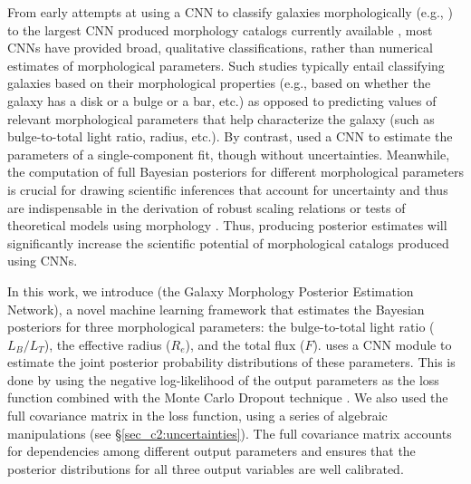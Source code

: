 From early attempts at using a CNN to classify galaxies morphologically (e.g.,  \citealp{Dieleman2015Rotation-invariantPrediction}) to the largest CNN produced morphology catalogs currently available \citep{Cheng2021GalaxyNetworks, Vega-Ferrero2021PushingSurvey}, most
CNNs have provided broad, qualitative classifications, rather than 
numerical estimates of morphological parameters. Such studies typically entail classifying galaxies based on their morphological properties (e.g., based on whether the galaxy has a disk or a bulge or a bar, etc.) as opposed to predicting values of relevant morphological parameters that help characterize the galaxy (such as bulge-to-total light ratio, radius, etc.).
By contrast, \citet{Tuccillo2018DeepFitting} used a CNN to estimate the parameters of a single-component \sersic{} fit, though  without uncertainties. 
Meanwhile, the computation of full Bayesian posteriors for different morphological parameters is crucial for drawing scientific inferences that account for uncertainty and thus are indispensable in 
the derivation of robust scaling relations  \citep[e.g.,][]{Bernardi2013TheProfile, vanderWel20143D-HST+CANDELS:3} or tests of theoretical models using morphology \citep[e.g.,][]{Schawinski2014TheGalaxies}. Thus, producing posterior estimates will significantly increase the scientific potential of morphological catalogs produced using CNNs.

In this work, we introduce \gampen{} (the Galaxy Morphology Posterior Estimation Network), a novel machine learning framework that estimates the Bayesian posteriors for three morphological parameters: the bulge-to-total light ratio ($L_B/L_T$), the effective radius ($R_e$), and the total flux ($F$).
\gampen{} uses a %
CNN module to estimate the joint posterior probability distributions of these parameters. This is done by using the negative log-likelihood of the output parameters as the loss function combined with the Monte Carlo Dropout technique \citep{gal_2016}. We also used the full covariance matrix in the loss function, using a series of algebraic manipulations (see \S \ref{sec_c2:uncertainties}). The full covariance matrix accounts for dependencies among different output parameters and ensures that the posterior distributions for all three output variables are well calibrated.

